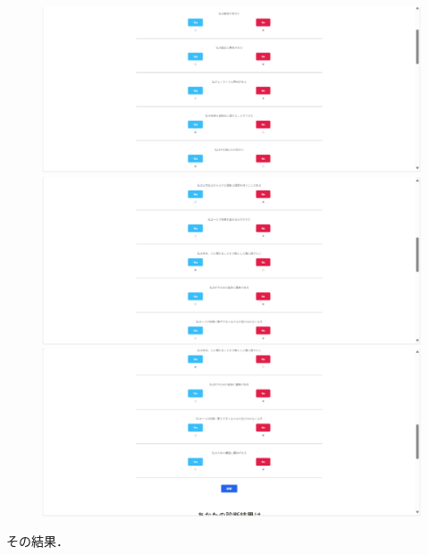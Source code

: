 \documentclass[a4j, titlepage]{jarticle}
\begin{document}
\begin{figure}[h]
  \centering
\includegraphics[scale=0.20]{dousakekka-9.png}
\includegraphics[scale=0.20]{dousakekka-10.png}
\includegraphics[scale=0.20]{dousakekka-11.png}
\end{figure}

その結果．
\end{document}
